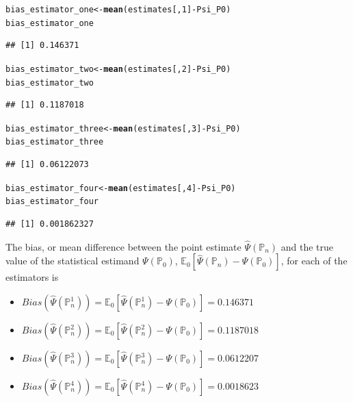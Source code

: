 \documentclass{article}\usepackage[]{graphicx}\usepackage[]{xcolor}
\makeatletter
\newcommand{\hlnum}[1]{\textcolor[rgb]{0.686,0.059,0.569}{#1}}%
\newcommand{\hlopt}[1]{\textcolor[rgb]{0,0,0}{#1}}%
\newcommand{\hlstd}[1]{\textcolor[rgb]{0.345,0.345,0.345}{#1}}%
\newcommand{\hlkwb}[1]{\textcolor[rgb]{0.69,0.353,0.396}{#1}}%
\newcommand{\hlkwd}[1]{\textcolor[rgb]{0.737,0.353,0.396}{\textbf{#1}}}%
\newenvironment{kframe}{%
 \def\at@end@of@kframe{}%
 \ifinner\ifhmode%
  \def\at@end@of@kframe{\end{minipage}}%
  \begin{minipage}{\columnwidth}%
 \fi\fi%
 \def\FrameCommand##1{\hskip\@totalleftmargin \hskip-\fboxsep
 \colorbox{shadecolor}{##1}\hskip-\fboxsep
     \hskip-\linewidth \hskip-\@totalleftmargin \hskip\columnwidth}%
 \MakeFramed {\advance\hsize-\width
   \@totalleftmargin\z@ \linewidth\hsize
   \@setminipage}}%
 {\par\unskip\endMakeFramed%
 \at@end@of@kframe}
\newenvironment{knitrout}{}{} %
\makeatother
\begin{document}
\begin{knitrout}
\color{fgcolor}\begin{kframe}
\begin{alltt}
\hlstd{bias_estimator_one} \hlkwb{<-} \hlkwd{mean}\hlstd{(estimates[,}\hlnum{1}\hlstd{]} \hlopt{-} \hlstd{Psi_P0)}
\hlstd{bias_estimator_one}
\end{alltt}
\begin{verbatim}
## [1] 0.146371
\end{verbatim}
\begin{alltt}
\hlstd{bias_estimator_two} \hlkwb{<-} \hlkwd{mean}\hlstd{(estimates[,}\hlnum{2}\hlstd{]} \hlopt{-} \hlstd{Psi_P0)}
\hlstd{bias_estimator_two}
\end{alltt}
\begin{verbatim}
## [1] 0.1187018
\end{verbatim}
\begin{alltt}
\hlstd{bias_estimator_three} \hlkwb{<-} \hlkwd{mean}\hlstd{(estimates[,}\hlnum{3}\hlstd{]} \hlopt{-} \hlstd{Psi_P0)}
\hlstd{bias_estimator_three}
\end{alltt}
\begin{verbatim}
## [1] 0.06122073
\end{verbatim}
\begin{alltt}
\hlstd{bias_estimator_four} \hlkwb{<-} \hlkwd{mean}\hlstd{(estimates[,}\hlnum{4}\hlstd{]} \hlopt{-} \hlstd{Psi_P0)}
\hlstd{bias_estimator_four}
\end{alltt}
\begin{verbatim}
## [1] 0.001862327
\end{verbatim}
\end{kframe}
\end{knitrout}
  
The bias, or mean difference between the point estimate $\hat{\Psi}(\mathbb{P}_n)$ and the true value of the statistical estimand $\Psi(\mathbb{P}_0)$, $\mathbb{E}_0[\hat{\Psi}(\mathbb{P}_n)-\Psi(\mathbb{P}_0)]$, for each of the estimators is

\begin{itemize}

  \item $Bias(\hat{\Psi}(\mathbb{P}_n^1))=\mathbb{E}_0[\hat{\Psi}(\mathbb{P}_n^1)-\Psi(\mathbb{P}_0)]=0.146371$
  \item $Bias(\hat{\Psi}(\mathbb{P}_n^2))=\mathbb{E}_0[\hat{\Psi}(\mathbb{P}_n^2)-\Psi(\mathbb{P}_0)]=0.1187018$
  \item $Bias(\hat{\Psi}(\mathbb{P}_n^3))=\mathbb{E}_0[\hat{\Psi}(\mathbb{P}_n^3)-\Psi(\mathbb{P}_0)]=0.0612207$
  \item $Bias(\hat{\Psi}(\mathbb{P}_n^4))=\mathbb{E}_0[\hat{\Psi}(\mathbb{P}_n^4)-\Psi(\mathbb{P}_0)]=0.0018623$

\end{itemize}
\end{document}
